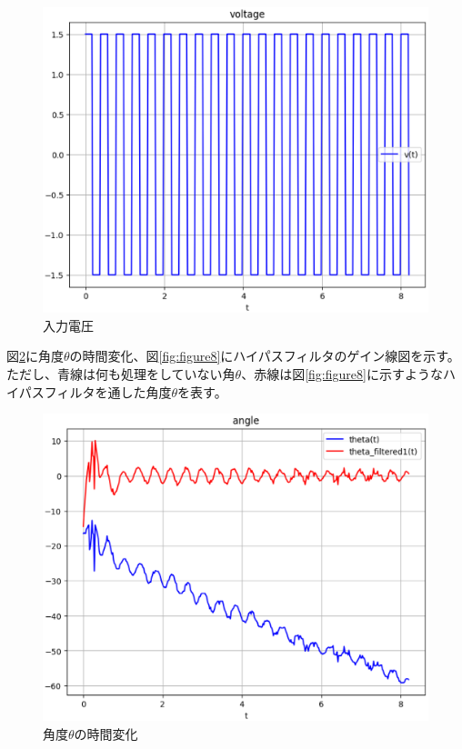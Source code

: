 \documentclass[a4paper,10.5pt]{ltjsarticle}
\begin{document}
\begin{figure}[h]
  \centering
  \includegraphics[scale=0.7]{figure6.eps}
  \caption{入力電圧}
  \label{fig:figure6}
\end{figure}
\clearpage
図\ref{fig:figure7}に角度$\theta$の時間変化、図\ref{fig:figure8}にハイパスフィルタのゲイン線図を示す。ただし、青線は何も処理をしていない角$\theta$、赤線は図\ref{fig:figure8}に示すようなハイパスフィルタを通した角度$\theta$を表す。
\begin{figure}[h]
  \centering
  \includegraphics[scale=0.7]{figure7.eps}
  \caption{角度$\theta$の時間変化}
  \label{fig:figure7}
\end{figure}
\end{document}
